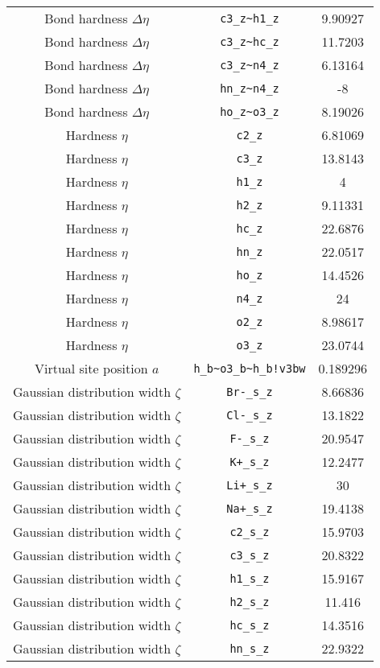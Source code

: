 \begin{table}[ht]
\begin{tabular}{|c|c|c|}
Bond hardness $\Delta\eta$ & \verb^c3_z~h1_z^ & 9.90927 \\ 
Bond hardness $\Delta\eta$ & \verb^c3_z~hc_z^ & 11.7203 \\ 
Bond hardness $\Delta\eta$ & \verb^c3_z~n4_z^ & 6.13164 \\ 
Bond hardness $\Delta\eta$ & \verb^hn_z~n4_z^ & -8 \\ 
Bond hardness $\Delta\eta$ & \verb^ho_z~o3_z^ & 8.19026 \\ 
Hardness $\eta$ & \verb^c2_z^ & 6.81069 \\ 
Hardness $\eta$ & \verb^c3_z^ & 13.8143 \\ 
Hardness $\eta$ & \verb^h1_z^ & 4 \\ 
Hardness $\eta$ & \verb^h2_z^ & 9.11331 \\ 
Hardness $\eta$ & \verb^hc_z^ & 22.6876 \\ 
Hardness $\eta$ & \verb^hn_z^ & 22.0517 \\ 
Hardness $\eta$ & \verb^ho_z^ & 14.4526 \\ 
Hardness $\eta$ & \verb^n4_z^ & 24 \\ 
Hardness $\eta$ & \verb^o2_z^ & 8.98617 \\ 
Hardness $\eta$ & \verb^o3_z^ & 23.0744 \\ 
Virtual site position $a$ & \verb^h_b~o3_b~h_b!v3bw^ & 0.189296 \\ 
Gaussian distribution width $\zeta$ & \verb^Br-_s_z^ & 8.66836 \\ 
Gaussian distribution width $\zeta$ & \verb^Cl-_s_z^ & 13.1822 \\ 
Gaussian distribution width $\zeta$ & \verb^F-_s_z^ & 20.9547 \\ 
Gaussian distribution width $\zeta$ & \verb^K+_s_z^ & 12.2477 \\ 
Gaussian distribution width $\zeta$ & \verb^Li+_s_z^ & 30 \\ 
Gaussian distribution width $\zeta$ & \verb^Na+_s_z^ & 19.4138 \\ 
Gaussian distribution width $\zeta$ & \verb^c2_s_z^ & 15.9703 \\ 
Gaussian distribution width $\zeta$ & \verb^c3_s_z^ & 20.8322 \\ 
Gaussian distribution width $\zeta$ & \verb^h1_s_z^ & 15.9167 \\ 
Gaussian distribution width $\zeta$ & \verb^h2_s_z^ & 11.416 \\ 
Gaussian distribution width $\zeta$ & \verb^hc_s_z^ & 14.3516 \\ 
Gaussian distribution width $\zeta$ & \verb^hn_s_z^ & 22.9322 \\ 

\end{tabular}
\end{table}
